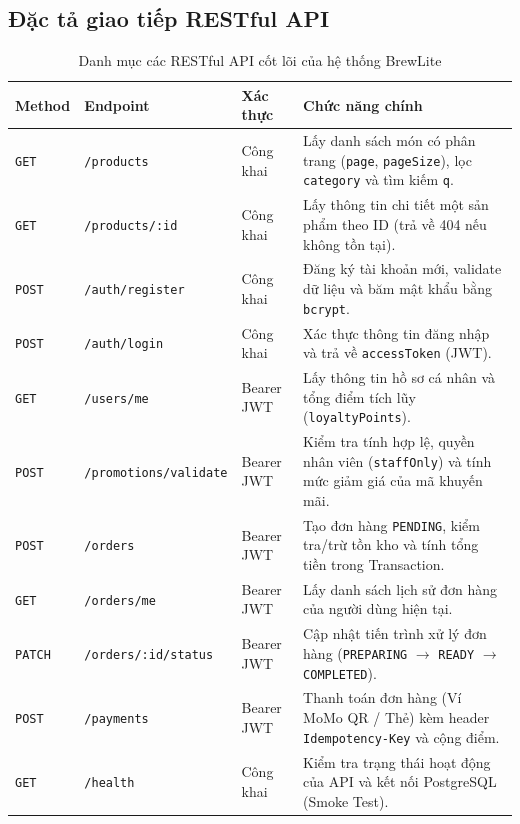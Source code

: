 \subsection{Đặc tả giao tiếp RESTful API}
\begin{table}[H]
\centering
\small
\renewcommand{\arraystretch}{1.25}
\caption{Danh mục các RESTful API cốt lõi của hệ thống BrewLite}
\begin{tabularx}{\textwidth}{|l|l|l|X|}
\hline
\textbf{Method} & \textbf{Endpoint} & \textbf{Xác thực} & \textbf{Chức năng chính} \\
\hline
\texttt{GET} & \texttt{/products} & Công khai & Lấy danh sách món có phân trang (\texttt{page}, \texttt{pageSize}), lọc \texttt{category} và tìm kiếm \texttt{q}. \\
\hline
\texttt{GET} & \texttt{/products/:id} & Công khai & Lấy thông tin chi tiết một sản phẩm theo ID (trả về 404 nếu không tồn tại). \\
\hline
\texttt{POST} & \texttt{/auth/register} & Công khai & Đăng ký tài khoản mới, validate dữ liệu và băm mật khẩu bằng \texttt{bcrypt}. \\
\hline
\texttt{POST} & \texttt{/auth/login} & Công khai & Xác thực thông tin đăng nhập và trả về \texttt{accessToken} (JWT). \\
\hline
\texttt{GET} & \texttt{/users/me} & Bearer JWT & Lấy thông tin hồ sơ cá nhân và tổng điểm tích lũy (\texttt{loyaltyPoints}). \\
\hline
\texttt{POST} & \texttt{/promotions/validate} & Bearer JWT & Kiểm tra tính hợp lệ, quyền nhân viên (\texttt{staffOnly}) và tính mức giảm giá của mã khuyến mãi. \\
\hline
\texttt{POST} & \texttt{/orders} & Bearer JWT & Tạo đơn hàng \texttt{PENDING}, kiểm tra/trừ tồn kho và tính tổng tiền trong Transaction. \\
\hline
\texttt{GET} & \texttt{/orders/me} & Bearer JWT & Lấy danh sách lịch sử đơn hàng của người dùng hiện tại. \\
\hline
\texttt{PATCH} & \texttt{/orders/:id/status} & Bearer JWT & Cập nhật tiến trình xử lý đơn hàng (\texttt{PREPARING} $\rightarrow$ \texttt{READY} $\rightarrow$ \texttt{COMPLETED}). \\
\hline
\texttt{POST} & \texttt{/payments} & Bearer JWT & Thanh toán đơn hàng (Ví MoMo QR / Thẻ) kèm header \texttt{Idempotency-Key} và cộng điểm. \\
\hline
\texttt{GET} & \texttt{/health} & Công khai & Kiểm tra trạng thái hoạt động của API và kết nối PostgreSQL (Smoke Test). \\
\hline
\end{tabularx}
\end{table}

